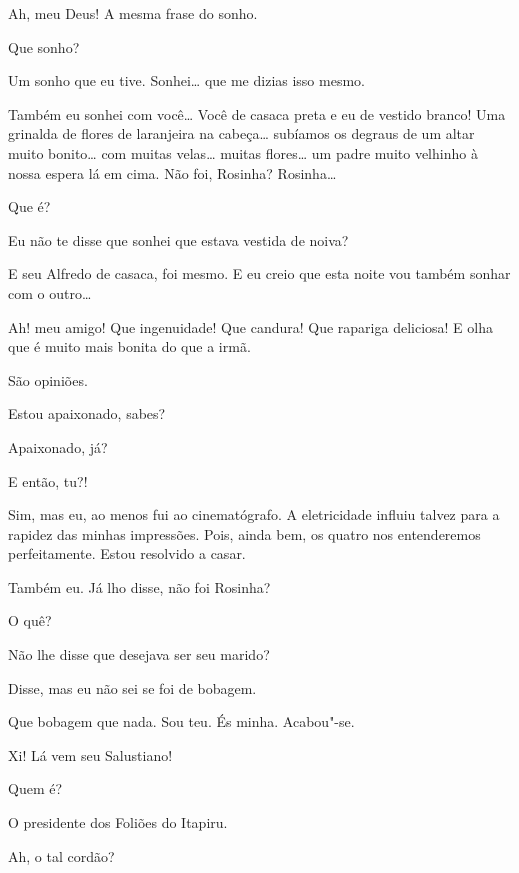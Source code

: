  Ah, meu Deus! A
mesma frase do sonho.

 Que sonho?

 Um sonho que eu
tive. Sonhei\ldots{} que me dizias isso mesmo.

 Também eu sonhei
com você\ldots{} Você de casaca preta e eu de vestido
branco! Uma grinalda de flores de laranjeira na cabeça\ldots{} 
subíamos os degraus de um altar muito bonito\ldots{} com muitas
velas\ldots{} muitas flores\ldots{} um padre muito velhinho à
nossa espera lá em cima.  Não foi, Rosinha?
 Rosinha\ldots

   Que é?

 Eu não te disse que sonhei que estava vestida de noiva?

 E seu Alfredo de
casaca, foi mesmo. E eu creio que esta noite vou também
sonhar com o outro\ldots

  Ah!
meu amigo! Que ingenuidade! Que candura! Que rapariga deliciosa! E olha
que é muito mais bonita do que a irmã.

 São opiniões.

 Estou apaixonado,
sabes?

 Apaixonado, já?

 E então, tu?!

 Sim, mas eu, ao
menos fui ao cinematógrafo. A eletricidade influiu
talvez para a rapidez das minhas impressões. Pois,
ainda bem, os quatro nos entenderemos perfeitamente. Estou
resolvido a casar.

 Também eu. Já lho
disse,  não foi Rosinha?

 O quê?

 Não lhe disse que
desejava ser seu marido?

 Disse, mas eu
não sei se foi de bobagem.  

 Que
bobagem que nada. Sou teu. És minha. Acabou"-se.

 Xi! Lá
vem seu Salustiano!

 Quem é?

 O presidente dos Foliões do Itapiru.

 Ah, o tal cordão?

